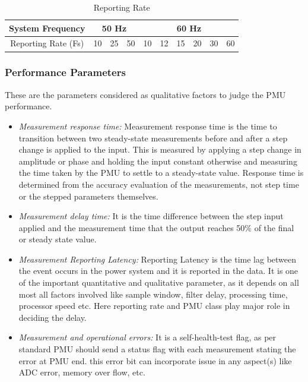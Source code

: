 \begin{table}[h]
	\begin{center}
		\setlength\arrayrulewidth{1pt}
		\begin{tabular}{|c|c|c|c|c|c|c|c|c|c|}
			\hline
			System Frequency & \multicolumn{3}{c}{50 Hz} & \multicolumn{6}{|c|}{60 Hz}\\
			\hline 
			Reporting Rate (Fs)& 10 & 25 & 50 & 	10& 12 &15 & 20 & 30 & 60\\
			\hline
		\end{tabular}
	\end{center}
		\caption{Reporting Rate}
\end{table}
 

\subsubsection{Performance Parameters}
These are the parameters considered as qualitative factors to judge the PMU performance. 

\begin{itemize}
	\item  \textit{Measurement response time:} Measurement response time is the time to transition between two steady-state measurements before and
	after a step change is applied to the input. This is measured by applying a step change in amplitude or phase and holding the input constant otherwise and measuring the time taken  by the PMU to settle to a steady-state value. Response time is determined from the accuracy evaluation of the measurements, not step time or the stepped	parameters themselves.
	\item \textit{Measurement delay time:} It is the time difference between the step input applied and the measurement time that the output reaches 50\% of the final or steady state value.  
	\item \textit{Measurement Reporting Latency:} Reporting Latency is the time lag between the event occurs in the power system and it is reported in the data. It is one of the important quantitative and qualitative parameter, as it depends on all most all factors involved like sample window, filter delay, processing time, processor speed etc. Here reporting rate and PMU class play major role in deciding the delay. 
	\item \textit{Measurement and operational errors:} It is a self-health-test flag, as per standard PMU should send a status flag with each measurement stating the error at PMU end. this error bit can incorporate issue in any aspect(s) like ADC error, memory over flow, etc.
\end{itemize}

